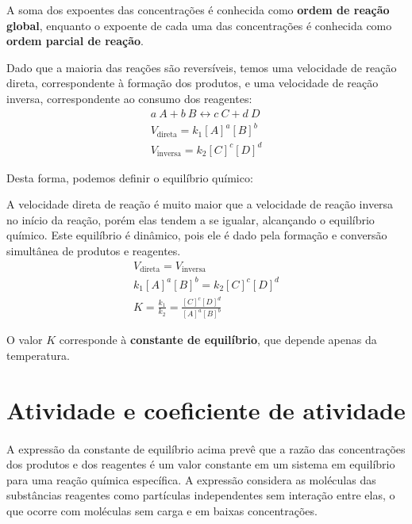 A soma dos expoentes das concentrações é conhecida como \textbf{ordem de reação global}, enquanto o expoente de cada uma das concentrações é conhecida como \textbf{ordem parcial de reação}.

\begin{definition}
    Dado que a maioria das reações são reversíveis, temos uma velocidade de reação direta, correspondente à formação dos produtos, e uma velocidade de reação inversa, correspondente ao consumo dos reagentes:
    \begin{gather}
        a \ A + b \ B \leftrightarrow c \ C + d \ D \\
        V_{\text{direta}} = k_1 [A]^a[B]^b \\
        V_{\text{inversa}} = k_2 [C]^c [D]^d
    \end{gather}
\end{definition}

Desta forma, podemos definir o equilíbrio químico:

\begin{definition}
    A velocidade direta de reação é muito maior que a velocidade de reação inversa no início da reação, porém elas tendem a se igualar, alcançando o equilíbrio químico. Este equilíbrio é dinâmico, pois ele é dado pela formação e conversão simultânea de produtos e reagentes.
    \begin{gather}
        V_{\text{direta}} = V_{\text{inversa}} \\
        k_1[A]^a[B]^b = k_2[C]^c[D]^d \\
        K = \frac{k_1}{k_2} = \frac{[C]^{c}[D]^{d}}{[A]^{a}[B]^b}
    \end{gather}

    O valor $K$ corresponde à \textbf{constante de equilíbrio}, que depende apenas da temperatura.
\end{definition}

\section*{Atividade e coeficiente de atividade}

\paragraph*{ } A expressão da constante de equilíbrio acima prevê que a razão das concentrações dos produtos e dos reagentes é um valor constante em um sistema em equilíbrio para uma reação química específica. A expressão considera as moléculas das substâncias reagentes como partículas independentes sem interação entre elas, o que ocorre com moléculas sem carga e em baixas concentrações.

